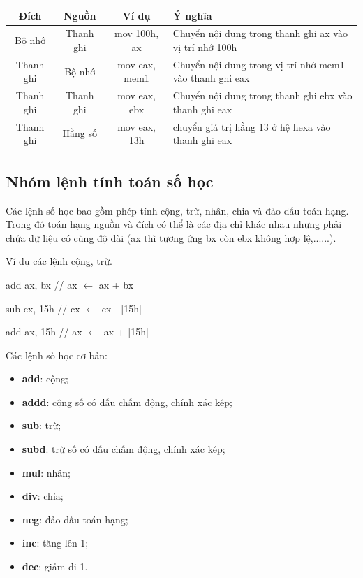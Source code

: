 \begin{table}
    \centering
    \begin{tabular}{ | c | c | c | p{} | } 
    \hline
    Đích & Nguồn & Ví dụ & Ý nghĩa \\ 
    \hline
    Bộ nhớ & Thanh ghi & mov 100h, ax & Chuyển nội dung trong thanh ghi ax vào vị trí nhớ 100h \\ 
    \hline
    Thanh ghi & Bộ nhớ & mov eax, mem1 & Chuyển nội dung trong vị trí nhớ mem1 vào thanh ghi eax \\ 
    \hline
    Thanh ghi & Thanh ghi & mov eax, ebx & Chuyển nội dung trong thanh ghi ebx vào thanh ghi eax \\
    \hline
    Thanh ghi & Hằng số & mov eax, 13h & chuyển giá trị hằng 13 ở hệ hexa vào thanh ghi eax \\
    \hline
    \end{tabular}
\end{table}

\subsection*{Nhóm lệnh tính toán số học}

Các lệnh số học bao gồm phép tính cộng, trừ, nhân, chia và đảo dấu toán hạng. Trong đó toán hạng nguồn và đích có thể là các địa chỉ khác nhau nhưng phải chứa dữ liệu có cùng độ dài (ax thì tương ứng bx còn ebx không hợp lệ,......). 

\begin{example}
    Ví dụ các lệnh cộng, trừ.

    add ax, bx // ax $\leftarrow$ ax + bx

    sub cx, 15h // cx $\leftarrow$ cx - [15h]

    add ax, 15h // ax $\leftarrow$ ax + [15h]
\end{example}

Các lệnh số học cơ bản:

\begin{itemize}
    \item \textbf{add}: cộng;
    \item \textbf{addd}: cộng số có dấu chấm động, chính xác kép;
    \item \textbf{sub}: trừ;
    \item \textbf{subd}: trừ số có dấu chấm động, chính xác kép;
    \item \textbf{mul}: nhân;
    \item \textbf{div}: chia;
    \item \textbf{neg}: đảo dấu toán hạng;
    \item \textbf{inc}: tăng lên 1;
    \item \textbf{dec}: giảm đi 1.
\end{itemize}

